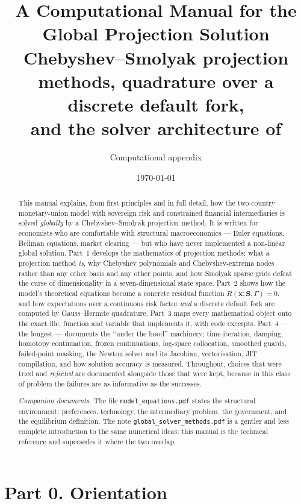 \documentclass[11pt]{article}
\title{\vspace{-1.4cm}\bfseries A Computational Manual for the\\
Global Projection Solution\\[6pt]
\large Chebyshev--Smolyak projection methods, quadrature over a discrete
default fork,\\ and the solver architecture of \code{code/global/solver\_recursive/}}
\author{Computational appendix}
\date{\today}
\numberwithin{equation}{section}
\newcommand{\code}[1]{\texttt{\small #1}}
\newcommand{\bx}{\mathbf{x}}
\newcommand{\bS}{\mathbf{S}}
\theoremstyle{definition}
\theoremstyle{plain}
\theoremstyle{remark}
\begin{document}
\maketitle

\begin{abstract}
\noindent This manual explains, from first principles and in full detail, how the
two-country monetary-union model with sovereign risk and constrained financial
intermediaries is solved \emph{globally} by a Chebyshev--Smolyak projection method.
It is written for economists who are comfortable with structural macroeconomics ---
Euler equations, Bellman equations, market clearing --- but who have never
implemented a non-linear global solution. Part~1 develops the mathematics of
projection methods: what a projection method \emph{is}, why Chebyshev polynomials
and Chebyshev-extrema nodes rather than any other basis and any other points, and
how Smolyak sparse grids defeat the curse of dimensionality in a seven-dimensional
state space. Part~2 shows how the model's theoretical equations become a concrete
residual function $R(\bx;\bS,\Gamma)=0$, and how expectations over a continuous risk
factor \emph{and} a discrete default fork are computed by Gauss--Hermite quadrature.
Part~3 maps every mathematical object onto the exact file, function and variable
that implements it, with code excerpts. Part~4 --- the longest --- documents the
``under the hood'' machinery: time iteration, damping, homotopy continuation, frozen
continuations, log-space collocation, smoothed guards, failed-point masking, the
Newton solver and its Jacobian, vectorisation, JIT compilation, and how solution
accuracy is measured. Throughout, choices that were tried and \emph{rejected} are
documented alongside those that were kept, because in this class of problem the
failures are as informative as the successes.

\medskip
\noindent\emph{Companion documents.} The file \code{model\_equations.pdf} states
the structural environment: preferences, technology, the intermediary problem, the
government, and the equilibrium definition. The note
\code{global\_solver\_methods.pdf} is a gentler and less complete introduction to
the same numerical ideas; this manual is the technical reference and supersedes it
where the two overlap.
\end{abstract}

\clearpage
\tableofcontents
\clearpage

\section*{Part 0. Orientation}
\setcounter{section}{0}
\end{document}
